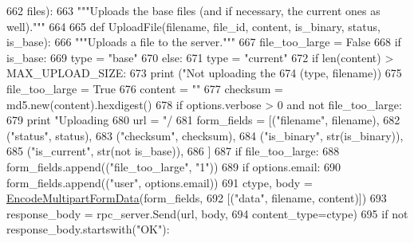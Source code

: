 \begin{DoxyCode}
662                       files):
663     \textcolor{stringliteral}{"""Uploads the base files (and if necessary, the current ones as well)."""}
664 
665     \textcolor{keyword}{def }UploadFile(filename, file\_id, content, is\_binary, status, is\_base):
666       \textcolor{stringliteral}{"""Uploads a file to the server."""}
667       file\_too\_large = \textcolor{keyword}{False}
668       \textcolor{keywordflow}{if} is\_base:
669         type = \textcolor{stringliteral}{"base"}
670       \textcolor{keywordflow}{else}:
671         type = \textcolor{stringliteral}{"current"}
672       \textcolor{keywordflow}{if} len(content) > MAX\_UPLOAD\_SIZE:
673         \textcolor{keywordflow}{print} (\textcolor{stringliteral}{"Not uploading the %
674                (type, filename))
675         file\_too\_large = \textcolor{keyword}{True}
676         content = \textcolor{stringliteral}{""}
677       checksum = md5.new(content).hexdigest()
678       \textcolor{keywordflow}{if} options.verbose > 0 \textcolor{keywordflow}{and} \textcolor{keywordflow}{not} file\_too\_large:
679         \textcolor{keywordflow}{print} \textcolor{stringliteral}{"Uploading %
680       url = \textcolor{stringliteral}{"/%
681       form\_fields = [(\textcolor{stringliteral}{"filename"}, filename),
682                      (\textcolor{stringliteral}{"status"}, status),
683                      (\textcolor{stringliteral}{"checksum"}, checksum),
684                      (\textcolor{stringliteral}{"is\_binary"}, str(is\_binary)),
685                      (\textcolor{stringliteral}{"is\_current"}, str(\textcolor{keywordflow}{not} is\_base)),
686                     ]
687       \textcolor{keywordflow}{if} file\_too\_large:
688         form\_fields.append((\textcolor{stringliteral}{"file\_too\_large"}, \textcolor{stringliteral}{"1"}))
689       \textcolor{keywordflow}{if} options.email:
690         form\_fields.append((\textcolor{stringliteral}{"user"}, options.email))
691       ctype, body = \hyperlink{namespaceupload_ae12985a2c860c124c502dd2099b702eb}{EncodeMultipartFormData}(form\_fields,
692                                             [(\textcolor{stringliteral}{"data"}, filename, content)])
693       response\_body = rpc\_server.Send(url, body,
694                                       content\_type=ctype)
695       \textcolor{keywordflow}{if} \textcolor{keywordflow}{not} response\_body.startswith(\textcolor{stringliteral}{"OK"}):
}}}
\end{DoxyCode}
